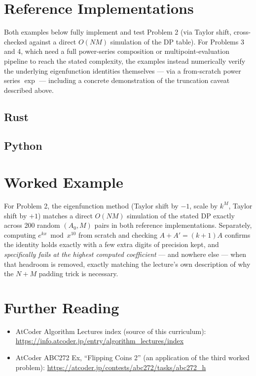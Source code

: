 \documentclass[11pt]{article}
\begin{document}
\section{Reference Implementations}
Both examples below fully implement and test Problem 2 (via Taylor
shift, cross-checked against a direct $O(NM)$ simulation of the DP
table). For Problems 3 and 4, which need a full power-series composition
or multipoint-evaluation pipeline to reach the stated complexity, the
examples instead numerically verify the underlying eigenfunction
identities themselves --- via a from-scratch power series $\exp$ ---
including a concrete demonstration of the truncation caveat described
above.

\codenote
\subsection{Rust}

\subsection{Python}

\section{Worked Example}
\begin{examplebox}
For Problem 2, the eigenfunction method (Taylor shift by $-1$, scale by
$k^M$, Taylor shift by $+1$) matches a direct $O(NM)$ simulation of the
stated DP exactly across 200 random $(A_0, M)$ pairs in both reference
implementations. Separately, computing $e^{kx} \bmod x^{10}$ from scratch
and checking $A+A'=(k+1)A$ confirms the identity holds exactly with a few
extra digits of precision kept, and \emph{specifically fails at the
highest computed coefficient} --- and nowhere else --- when that
headroom is removed, exactly matching the lecture's own description of
why the $N{+}M$ padding trick is necessary.
\end{examplebox}

\section{Further Reading}
\begin{itemize}[leftmargin=1.5em]
  \item AtCoder Algorithm Lectures index (source of this curriculum):
        \url{https://info.atcoder.jp/entry/algorithm_lectures/index}
  \item AtCoder ABC272 Ex, ``Flipping Coins 2'' (an application of the
        third worked problem):
        \url{https://atcoder.jp/contests/abc272/tasks/abc272_h}
\end{itemize}
\end{document}
